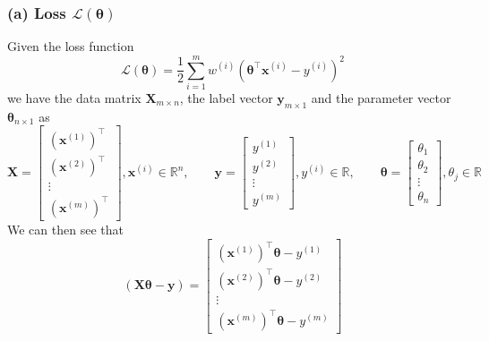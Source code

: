 \subsubsection*{(a) Loss \( \mathcal{L}(\boldsymbol{\theta}) \)}

Given the loss function
\begin{equation*}
    \mathcal{L}(\boldsymbol{\theta})
    =
    \frac{1}{2}
    \sum_{i=1}^{m}
    w^{(i)}{\left(\boldsymbol{\theta}^{\top} \mathbf{x}^{(i)}-y^{(i)}\right)}^{2}
\end{equation*}
we have the data matrix \( \mathbf{X}_{m \times n} \), the label vector \( \mathbf{y}_{m \times 1} \) and the parameter vector \( \boldsymbol{\theta}_{n \times 1} \) as
\begin{equation*}
    \mathbf{X}
    =
    \begin{bmatrix}
        {\left(\mathbf{x}^{(1)}\right)}^\top \\
        {\left(\mathbf{x}^{(2)}\right)}^\top \\
        \vdots                               \\
        {\left(\mathbf{x}^{(m)}\right)}^\top
    \end{bmatrix}
    , \mathbf{x}^{(i)} \in \mathbb{R}^{n}
    , \qquad
    \mathbf{y}
    =
    \begin{bmatrix}
        y^{(1)} \\
        y^{(2)} \\
        \vdots  \\
        y^{(m)}
    \end{bmatrix}
    , y^{(i)} \in \mathbb{R}
    , \qquad
    \boldsymbol{\theta}
    =
    \begin{bmatrix}
        \theta_{1} \\
        \theta_{2} \\
        \vdots     \\
        \theta_{n}
    \end{bmatrix}
    , \theta_{j} \in \mathbb{R}
\end{equation*}
We can then see that
\begin{equation*}
    (\mathbf{X} \boldsymbol{\theta} - \mathbf{y})
    =
    \begin{bmatrix}
        {\left(\mathbf{x}^{(1)}\right)}^\top \boldsymbol{\theta}
        - y^{(1)}
        \\
        {\left(\mathbf{x}^{(2)}\right)}^\top \boldsymbol{\theta}
        - y^{(2)}
        \\
        \vdots
        \\
        {\left(\mathbf{x}^{(m)}\right)}^\top \boldsymbol{\theta}
        - y^{(m)}
    \end{bmatrix}
\end{equation*}
